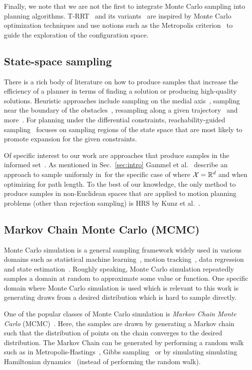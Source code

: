 \documentclass[letterpaper, 10 pt, conference]{ieeeconf}  %
\begin{document}
Finally, we note that we are not the first to integrate Monte Carlo sampling into planning algorithms. T-RRT~\cite{JCS10} and its variants~\cite{DSC13} are inspired by Monte Carlo optimization techniques and use notions such as the Metropolis criterion~\cite{CG95} to guide the exploration of the configuration space.


\subsection{State-space sampling}
\label{subsec:sampling}
There is a rich body of literature on how to produce samples that increase the efficiency of a planner in terms of finding a solution or producing high-quality solutions.
Heuristic approaches include
sampling on the medial axis~\cite{WAS99a, WAS99b, LTA03, YDLTA14},
sampling near the boundary of the obstacles~\cite{ABDJV98, YTEA12},
resampling along a given trajectory~\cite{APD11, AS11}
and more~\cite{US03, SWT09}.
For planning under the differential constraints,
reachability-guided sampling~\cite{SWT09, PLAEFRA17} focuses on sampling regions of the state space that are most likely to promote expansion for the given constraints.


Of specific interest to our work are approaches that produce samples in the informed set~\Cinf.
As mentioned in Sec.~\ref{sec:intro} Gammel et al.~\cite{GSB14} describe an approach to sample uniformly in~\Cinf for the specific case of where $\mathcal{X} = \mathbb{R}^d$ and when optimizing for path length.
To the best of our knowledge, the only method to produce samples in non-Euclidean spaces that are applied to motion planning problems (other than rejection sampling) is HRS by Kunz et al.~\cite{KTC16}.

\subsection{Markov Chain Monte Carlo (MCMC)}
\label{subsec:mcmc}
Monte Carlo simulation is a general sampling framework widely used in various domains such as
statistical machine learning~\cite{M97},
motion tracking~\cite{KBD04}, 
data regression~\cite{TL11} and 
state estimation~\cite{ASC13}.
Roughly speaking, Monte Carlo simulation repeatedly samples a domain at random to approximate some value or function.
One specific domain where Monte Carlo simulation is used which is relevant to this work is generating draws from a desired distribution which is hard to sample directly.

One of the popular classes of Monte Carlo simulation is 
\emph{Markov Chain Monte Carlo} (MCMC)~\cite{ADDJ03}.
Here, the samples are drawn by generating a Markov chain such that the distribution of points on the chain converges to the desired distribution.
The Markov Chain can be generated by performing a random walk such as
in Metropolis-Hastings~\cite{CG95}, 
Gibbs sampling~\cite{CK94}
or by simulating simulating Hamiltonian dynamics~\cite{N94} (instead of performing the random walk).
\end{document}
